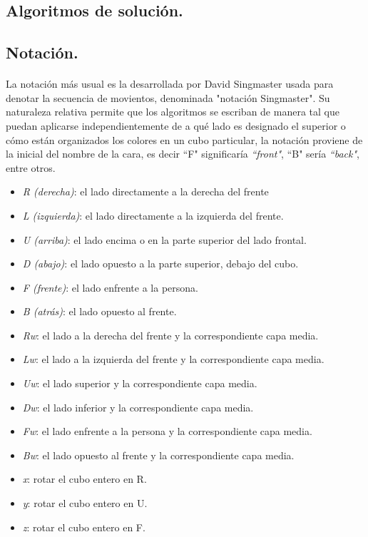 \documentclass[12pt, letterpaper]{article}
\begin{document}
\subsection{Algoritmos de solución.}
\subsection*{Notación.}
\paragraph{}
La notación más usual es la desarrollada por David Singmaster usada para denotar la secuencia de movientos, denominada "notación Singmaster". Su naturaleza relativa permite que los algoritmos se escriban de manera tal que puedan aplicarse independientemente de a qué lado es designado el superior o cómo están organizados los colores en un cubo particular, la notación proviene de la inicial del nombre de la cara, es decir ``F" significaría \emph{``front"}, ``B" sería \emph{``back"}, entre otros.
\begin{itemize}
	\item \emph{R (derecha)}: el lado directamente a la derecha del frente
	\item \emph{L (izquierda)}: el lado directamente a la izquierda del frente.
	\item \emph{U (arriba)}: el lado encima o en la parte superior del lado frontal.
	\item \emph{D (abajo)}: el lado opuesto a la parte superior, debajo del cubo.
	\item \emph{F (frente)}: el lado enfrente a la persona.
	\item \emph{B (atrás)}: el lado opuesto al frente.
	\item \emph{Rw}: el lado a la derecha del frente y la correspondiente capa media.
	\item \emph{Lw}: el lado a la izquierda del frente y la correspondiente capa media.
	\item \emph{Uw}: el lado superior y la correspondiente capa media.
	\item \emph{Dw}: el lado inferior y la correspondiente capa media.
	\item \emph{Fw}: el lado enfrente a la persona y la correspondiente capa media.
	\item \emph{Bw}: el lado opuesto al frente y la correspondiente capa media.
	\item \emph{x}: rotar el cubo entero en R.
	\item \emph{y}: rotar el cubo entero en U.
	\item \emph{z}: rotar el cubo entero en F.
\end{itemize}
\end{document}
